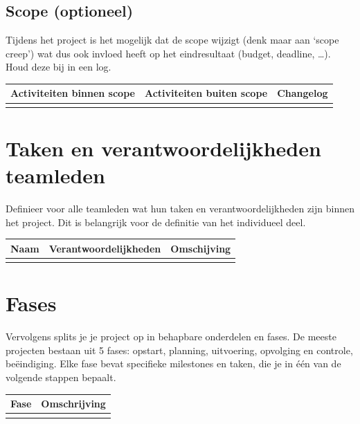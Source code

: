\documentclass{article}
\begin{document}
\subsection{Scope (optioneel)}
Tijdens het project is het mogelijk dat de scope wijzigt (denk maar aan ‘scope creep’) 
wat dus ook invloed heeft op het eindresultaat (budget, deadline, …). Houd deze bij in een log.  



\begin{table}[h]
  \begin{tabularx}{\textwidth}{| >{\raggedright\arraybackslash}X | >{\raggedright\arraybackslash}X | >{\centering\arraybackslash}X |}
  \hline
  Activiteiten binnen scope &  Activiteiten buiten scope & Changelog  \\ \hline
   &  &  \\ \hline
  \end{tabularx}
\end{table}



\section{Taken en verantwoordelijkheden teamleden}
Definieer voor alle teamleden wat hun taken en verantwoordelijkheden zijn binnen het project. 
Dit is belangrijk voor de definitie van het individueel deel.


\begin{table}[h]
  \begin{tabularx}{\textwidth}{| >{\raggedright\arraybackslash}X | >{\raggedright\arraybackslash}X | >{\centering\arraybackslash}X |}
  \hline
  Naam &  Verantwoordelijkheden & Omschijving  \\ \hline
   &  &  \\ \hline
  \end{tabularx}
\end{table}


\section{Fases}
Vervolgens splits je je project op in behapbare onderdelen en fases. De meeste projecten bestaan uit 5 fases: 
opstart, planning, uitvoering, opvolging en controle, beëindiging. Elke fase bevat specifieke milestones en taken, 
die je in één van de volgende stappen bepaalt. 


\begin{table}[h]
  \begin{tabularx}{\textwidth}{| >{\raggedright\arraybackslash}l |  >{\centering\arraybackslash}X |}
  \hline
  Fase &  Omschrijving   \\ \hline
   &  \\ \hline
  \end{tabularx}
\end{table}
\end{document}
